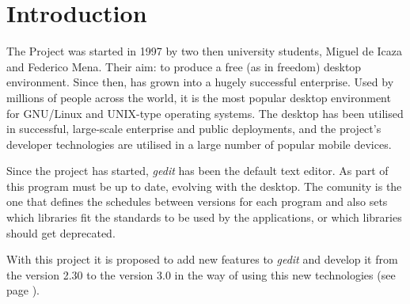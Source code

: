 
\chapter{Introduction}

The \GNOME Project was started in 1997 by two then university students, Miguel de Icaza and Federico Mena. Their aim: to produce a free (as in freedom) desktop environment. Since then, \GNOME has grown into a hugely successful enterprise. Used by millions of people across the world, it is the most popular desktop environment for GNU/Linux and UNIX-type operating systems. The desktop has been utilised in successful, large-scale enterprise and public deployments, and the project’s developer technologies are utilised in a large number of popular mobile devices\cite{website:gnome}.

Since the project has started, \emph{gedit} has been the default text editor. As part of \GNOME this program must be up to date, evolving with the desktop. The \GNOME comunity is the one that defines the schedules between versions for each program and also sets which libraries fit the standards to be used by the applications, or which libraries should get deprecated.

With this project it is proposed to add new features to \emph{gedit} and develop it from the version 2.30 to the version 3.0 in the way of using this new technologies (see page \pageref{chap:Technologies}).
